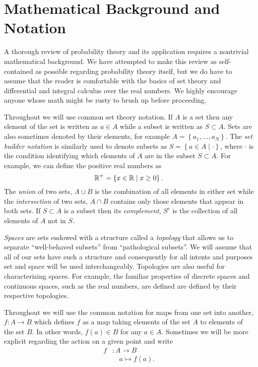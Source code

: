 \section{Mathematical Background and Notation}

A thorough review of probability theory and its application requires a nontrivial
mathematical background.  We have attempted to make this review as
self-contained as possible regarding probability theory itself, but we do have to 
assume that the reader is comfortable with the basics of set theory and differential 
and integral calculus over the real numbers.  We highly encourage anyone whose 
math might be rusty to brush up before proceeding.

Throughout we will use common set theory notation.  If $A$ is a set
then any element of the set is written as $a \in A$ while a subset is written
as $S \subset A$.  Sets are also sometimes denoted by their elements, for
example $A = \left\{ a_{1}, \ldots, a_{N} \right\}$.  The \emph{set builder
notation} is similarly used to denote subsets as 
$S = \left\{ a \in A \mid \cdot \right\}$, where $\cdot$ is the condition identifying
which elements of $A$ are in the subset $S \subset A$.  For example, we
can define the positive real numbers as 
%
\begin{equation*}
\mathbb{R}^{+} = \left\{ x \in \mathbb{R} \mid x \ge 0 \right\}.
\end{equation*}
%
The \emph{union} of two sets, $A \cup B$ is the combination of all 
elements in either set while the \emph{intersection} of two sets, 
$A \cap B$ contains only those elements that appear in both sets.
If $S \subset A$ is a subset then its \emph{complement}, $S^{c}$ is 
the collection of all elements of $A$ not in $S$.

\emph{Spaces} are sets endowed with a structure called a 
\emph{topology} that allows us to separate ``well-behaved subsets''
from ``pathological subsets''.  We will assume that all of our sets
have such a structure and consequently for all intents and purposes 
set and space will be used interchangeably.  Topologies are also
useful for characterizing spaces.  For example, the familiar properties
of discrete spaces and continuous spaces, such as the real numbers, 
are defined are defined by their respective topologies.

Throughout we will use the common notation for maps from one set into 
another, $f : A \rightarrow B$ which defines $f$ as a map taking elements 
of the set $A$ to elements of the set $B$. In other words, $f(a) \in B$ for 
any $a \in A$.  Sometimes we will be more explicit regarding the action
on a given point and write
%
\begin{align*}
f &: A \rightarrow B \\
  &\quad a \mapsto f \! \left( a \right).
\end{align*}

